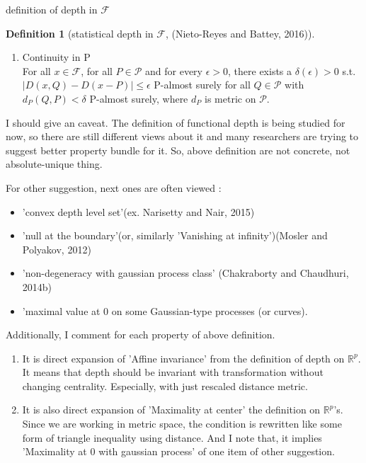 \documentclass[aspectratio=169,ignorenonframetext,9pt]{beamer}
\theoremstyle{plain}
\theoremstyle{definition}
\newtheorem{defn}{Definition}[section]
\begin{document}
\begin{frame}{definition of depth in $\mathcal{F}$}
\begin{defn}[statistical depth in $\mathcal{F}$, (Nieto-Reyes and Battey, 2016)]
\begin{enumerate}
            Then, $D$ has a property that $D(x,P_X)<D(f(x),P_{f(X)})$ for any $x\in C(\mathcal{F},P)$
            with $D(x,P)<sup_{y\in\mathcal{F}}D(y,P)$ and $f:\mathcal{F}\rightarrow\mathcal{F}$
            s.t. $f(y(v))=\alpha(v)y(v)$ with $\alpha(v)\in(0,1)$ for all $v\in L_{\delta}$ and $\alpha(v)=1$  otherwise
            where \(L_\delta = argsup_{H\in V} \{sup_{x,y\in C(\mathcal{F},P)} d(x(H),y(H)) \leq \delta\}\)
            for any $\delta\in inf_{v\in V}d(L(v),U(v)), d(L,U)$ s.t. $\lambda(L_\delta)>0$ and $\lambda(L_\delta^c)>0$.
        \item Continuity in P \\ 
            For all $x\in\mathcal{F}$, for all $P \in \mathcal{P}$ and for every $\epsilon>0$,
            there exists a $\delta(\epsilon)>0$ s.t. $|D(x,Q)-D(x-P)|\leq\epsilon$ P-almost surely for all $Q\in\mathcal{P}$ with
            $d_P(Q,P)<\delta$ P-almost surely, where $d_P$ is metric on $\mathcal{P}$.
        \end{enumerate}
    \end{defn}

I should give an caveat. The definition of functional depth is being studied for now, so
there are still different views about it and many researchers are trying to
suggest better property bundle for it. So, above definition are not concrete, not absolute-unique thing.

For other suggestion, next ones are often viewed :
\begin{itemize}
    \item 'convex depth level set'(ex. Narisetty and Nair, 2015)
    \item 'null at the boundary'(or, similarly 'Vanishing at infinity')(Mosler and Polyakov, 2012)
    \item 'non-degeneracy with gaussian process class' (Chakraborty and Chaudhuri, 2014b)
    \item 'maximal value at 0 on some Gaussian-type processes (or curves).
\end{itemize}

Additionally, I comment for each property of above definition.
\begin{enumerate}
    \item It is direct expansion of 'Affine invariance' from the definition of depth on $\mathbb{R}^p$.
    It means that depth should be invariant with transformation without changing centrality.
    Especially, with just rescaled distance metric.
    
    \item It is also direct expansion of 'Maximality at center' the definition on $\mathbb{R}^p$'s.
    Since we are working in metric space, the condition is rewritten like 
    some form of triangle inequality using distance.
    And I note that, it implies 'Maximality at 0 with gaussian process' of one item of other suggestion.


\end{enumerate}
\end{frame}
\end{document}
